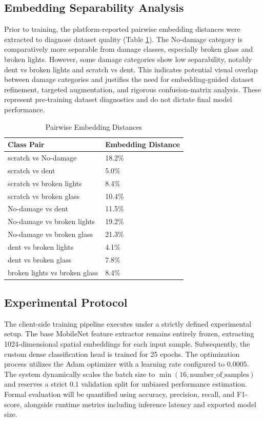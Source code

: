 \documentclass[conference]{IEEEtran}
\begin{document}
\subsection{Embedding Separability Analysis}
Prior to training, the platform-reported pairwise embedding distances were extracted to diagnose dataset quality (Table \ref{tab:embedding_distance}). The No-damage category is comparatively more separable from damage classes, especially broken glass and broken lights. However, some damage categories show low separability, notably dent vs broken lights and scratch vs dent. This indicates potential visual overlap between damage categories and justifies the need for embedding-guided dataset refinement, targeted augmentation, and rigorous confusion-matrix analysis. These represent pre-training dataset diagnostics and do not dictate final model performance.

\begin{table}[ht]
\centering
\caption{Pairwise Embedding Distances}
\label{tab:embedding_distance}
\begin{tabular}{ll}
\toprule
\textbf{Class Pair} & \textbf{Embedding Distance} \\
\midrule
scratch vs No-damage & 18.2\% \\
scratch vs dent & 5.0\% \\
scratch vs broken lights & 8.4\% \\
scratch vs broken glass & 10.4\% \\
No-damage vs dent & 11.5\% \\
No-damage vs broken lights & 19.2\% \\
No-damage vs broken glass & 21.3\% \\
dent vs broken lights & 4.1\% \\
dent vs broken glass & 7.8\% \\
broken lights vs broken glass & 8.4\% \\
\bottomrule
\end{tabular}
\end{table}

\subsection{Experimental Protocol}
The client-side training pipeline executes under a strictly defined experimental setup. The base MobileNet feature extractor remains entirely frozen, extracting 1024-dimensional spatial embeddings for each input sample. Subsequently, the custom dense classification head is trained for 25 epochs. The optimization process utilizes the Adam optimizer with a learning rate configured to $0.0005$. The system dynamically scales the batch size to $\min(16, \text{number\_of\_samples})$ and reserves a strict $0.1$ validation split for unbiased performance estimation. Formal evaluation will be quantified using accuracy, precision, recall, and F1-score, alongside runtime metrics including inference latency and exported model size.
\end{document}
